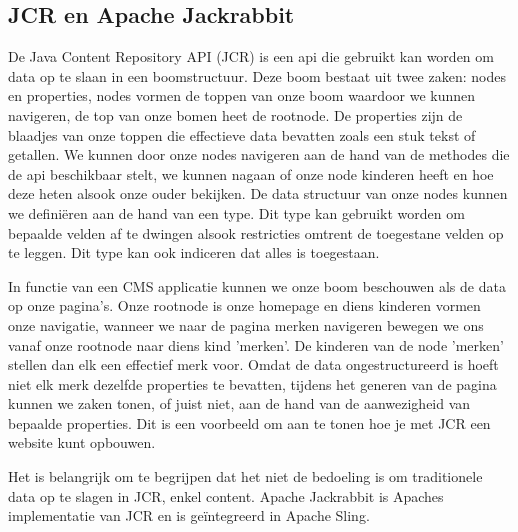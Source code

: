 \documentclass{article}
\begin{document}
	\subsection{JCR en Apache Jackrabbit}
	De Java Content Repository API (JCR) is een api die gebruikt kan worden om data op te slaan in een boomstructuur. Deze boom bestaat uit twee zaken: nodes en properties, nodes vormen de toppen van onze boom waardoor we kunnen navigeren, de top van onze bomen heet de rootnode. De properties zijn de blaadjes van onze toppen die effectieve data bevatten zoals een stuk tekst of getallen. We kunnen door onze nodes navigeren aan de hand van de methodes die de api beschikbaar stelt, we kunnen nagaan of onze node kinderen heeft en hoe deze heten alsook onze ouder bekijken. De data structuur van onze nodes kunnen we definiëren aan de hand van een type. Dit type kan gebruikt worden om bepaalde velden af te dwingen alsook restricties omtrent de toegestane velden op te leggen. Dit type kan ook indiceren dat alles is toegestaan. 
	\par
	In functie van een CMS applicatie kunnen we onze boom beschouwen als de data op onze pagina's. Onze rootnode is onze homepage en diens kinderen vormen onze navigatie, wanneer we naar de pagina merken navigeren bewegen we ons vanaf onze rootnode naar diens kind 'merken'. De kinderen van de node 'merken' stellen dan elk een effectief merk voor. Omdat de data ongestructureerd is hoeft niet elk merk dezelfde properties te bevatten, tijdens het generen van de pagina kunnen we zaken tonen, of juist niet, aan de hand van de aanwezigheid van bepaalde properties. Dit is een voorbeeld om aan te tonen hoe je met JCR een website kunt opbouwen.
	\par
	Het is belangrijk om te begrijpen dat het niet de bedoeling is om traditionele data op te slagen in JCR, enkel content. Apache Jackrabbit is Apaches implementatie van JCR en is geïntegreerd in Apache Sling.
\end{document}

